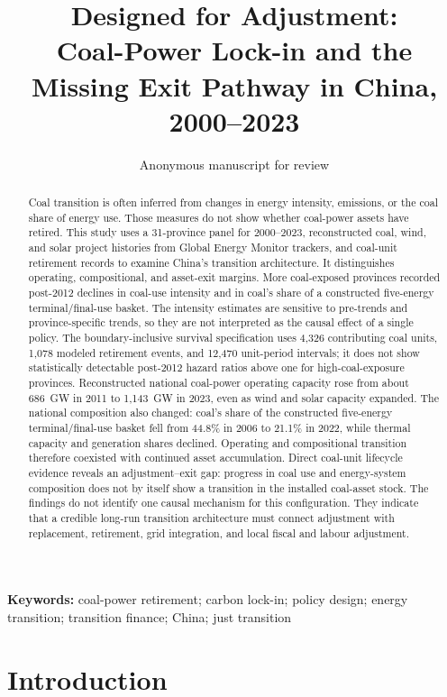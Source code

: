 \documentclass[11pt]{article}
\title{Designed for Adjustment:\\
Coal-Power Lock-in and the Missing Exit Pathway in China, 2000--2023}
\author{Anonymous manuscript for review}
\date{}
\begin{document}
\maketitle

\begin{abstract}
Coal transition is often inferred from changes in energy intensity, emissions, or the coal share of energy use. Those measures do not show whether coal-power assets have retired. This study uses a 31-province panel for 2000--2023, reconstructed coal, wind, and solar project histories from Global Energy Monitor trackers, and coal-unit retirement records to examine China's transition architecture. It distinguishes operating, compositional, and asset-exit margins. More coal-exposed provinces recorded post-2012 declines in coal-use intensity and in coal's share of a constructed five-energy terminal/final-use basket. The intensity estimates are sensitive to pre-trends and province-specific trends, so they are not interpreted as the causal effect of a single policy. The boundary-inclusive survival specification uses 4,326 contributing coal units, 1,078 modeled retirement events, and 12,470 unit-period intervals; it does not show statistically detectable post-2012 hazard ratios above one for high-coal-exposure provinces. Reconstructed national coal-power operating capacity rose from about 686~GW in 2011 to 1,143~GW in 2023, even as wind and solar capacity expanded. The national composition also changed: coal's share of the constructed five-energy terminal/final-use basket fell from 44.8\% in 2006 to 21.1\% in 2022, while thermal capacity and generation shares declined. Operating and compositional transition therefore coexisted with continued asset accumulation. Direct coal-unit lifecycle evidence reveals an adjustment--exit gap: progress in coal use and energy-system composition does not by itself show a transition in the installed coal-asset stock. The findings do not identify one causal mechanism for this configuration. They indicate that a credible long-run transition architecture must connect adjustment with replacement, retirement, grid integration, and local fiscal and labour adjustment.
\end{abstract}

\noindent\textbf{Keywords:} coal-power retirement; carbon lock-in; policy design; energy transition; transition finance; China; just transition

\section{Introduction}
\end{document}
